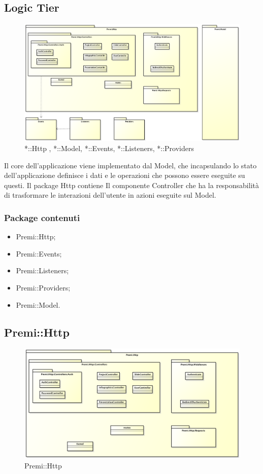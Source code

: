 \subsection{Logic Tier}
	\begin{figure}[h]
		\centering
		\includegraphics[width=\linewidth]{img/back-end_logic-tier_package}
		\caption[*::Http , *::Model, *::Events, *::Listeners, *::Providers]{*::Http , *::Model, *::Events, *::Listeners, *::Providers}
	\end{figure}
	Il core dell'applicazione viene implementato dal Model, che incapsulando lo stato dell'applicazione definisce i dati e le operazioni che possono essere eseguite su questi. Il package Http contiene Il componente Controller che ha la responsabilità di trasformare le interazioni dell'utente in azioni eseguite sul Model.
	
	\subsubsection*{Package contenuti}
	\begin{itemize}
		\item Premi::Http;
		\item Premi::Events;
		\item Premi::Listeners;
		\item Premi::Providers;
		\item Premi::Model.
	\end{itemize}

\newpage
\subsection{Premi::Http}
		\begin{figure}[h]
			\centering
			\includegraphics[width=0.9\linewidth]{img/premi_http}
			\caption[Premi::Http]{Premi::Http}
			\label{fig:premi_http}
		\end{figure}

